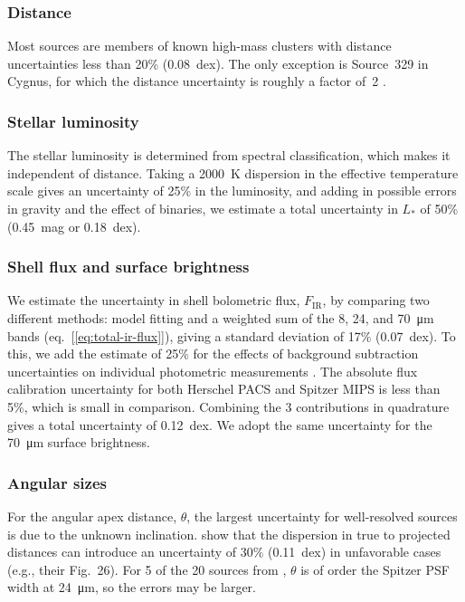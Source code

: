 \documentclass[useAMS, usenatbib, a4paper]{mnras}
\begin{document}
\subsubsection{Distance}
\label{sec:distance}

Most sources are members of known high-mass clusters with distance
uncertainties less than 20\% (0.08~dex). The only exception is
Source~329 in Cygnus, for which the distance uncertainty is roughly a
factor of~2 \citep{Kobulnicky:2018a}.

\subsubsection{Stellar luminosity}
\label{sec:stellar-luminosity}

The stellar luminosity is determined from spectral classification,
which makes it independent of distance.  Taking a \SI{2000}{K}
dispersion in the effective temperature scale \citep{Martins:2005a}
gives an uncertainty of 25\% in the luminosity, and adding in possible
errors in gravity and the effect of binaries, we estimate a total
uncertainty in \(L_*\) of 50\% (0.45~mag or 0.18~dex).

\subsubsection{Shell flux and surface brightness}
\label{sec:shell-flux-surface}

We estimate the uncertainty in shell bolometric flux,
\(F_{\text{IR}}\), by comparing two different methods: model fitting
\citep{Kobulnicky:2017a} and a weighted sum of the 8, 24, and
\SI{70}{\um} bands (eq.~[\ref{eq:total-ir-flux}]), giving a standard
deviation of 17\% (0.07~dex).  To this, we add the estimate of 25\%
for the effects of background subtraction uncertainties on individual
photometric measurements \citep{Kobulnicky:2017a}. The absolute flux
calibration uncertainty for both Herschel PACS \citep{Balog:2014a} and
Spitzer MIPS \citep{Engelbracht:2007a} is less than 5\%, which is
small in comparison. Combining the 3 contributions in quadrature gives
a total uncertainty of 0.12~dex.  We adopt the same uncertainty for
the \SI{70}{\um} surface brightness.

\subsubsection{Angular sizes}
\label{sec:angular-sizes}

For the angular apex distance, \(\theta\), the largest uncertainty for
well-resolved sources is due to the unknown inclination.
\citet{Tarango-Yong:2018a} show that the dispersion in true to
projected distances can introduce an uncertainty of \(30\%\)
(0.11~dex) in unfavorable cases (e.g., their Fig.~26).  For 5 of the
20 sources from \citet{Kobulnicky:2018a}, \(\theta\) is of order the
Spitzer PSF width at \SI{24}{\um}, so the errors may be larger.
\end{document}
